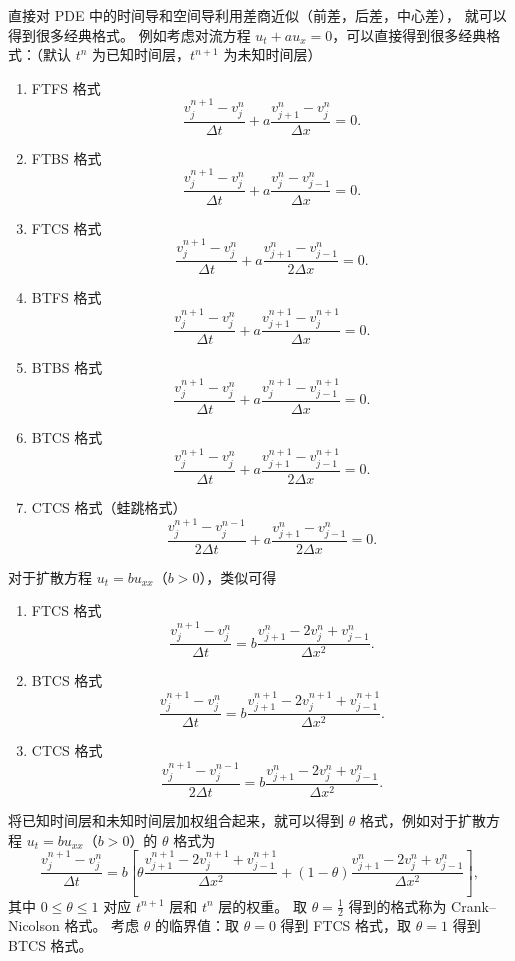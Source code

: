 直接对 PDE 中的时间导和空间导利用差商近似（前差，后差，中心差），
就可以得到很多经典格式。
例如考虑对流方程 $u_t + a u_x = 0$，可以直接得到很多经典格式：（默认 $t^n$ 为已知时间层，$t^{n+1}$ 为未知时间层）
\begin{enumerate}
    \item FTFS 格式
          \[
              \frac{v_{j}^{n+1} - v_{j}^n}{\Delta t} + a \frac{v_{j+1}^n - v_{j}^n}{\Delta x} = 0.
          \]
    \item FTBS 格式
          \[
              \frac{v_{j}^{n+1} - v_{j}^n}{\Delta t} + a \frac{v_{j}^n - v_{j-1}^n}{\Delta x} = 0.
          \]
    \item FTCS 格式
          \[
              \frac{v_{j}^{n+1} - v_{j}^n}{\Delta t} + a \frac{v_{j+1}^n - v_{j-1}^n}{2\Delta x} = 0.
          \]
    \item BTFS 格式
          \[
              \frac{v_{j}^{n+1} - v_{j}^n}{\Delta t} + a \frac{v_{j+1}^{n+1} - v_{j}^{n+1}}{\Delta x} = 0.
          \]
    \item BTBS 格式
          \[
              \frac{v_{j}^{n+1} - v_{j}^n}{\Delta t} + a \frac{v_{j}^{n+1} - v_{j-1}^{n+1}}{\Delta x} = 0.
          \]
    \item BTCS 格式
          \[
              \frac{v_{j}^{n+1} - v_{j}^n}{\Delta t} + a \frac{v_{j+1}^{n+1} - v_{j-1}^{n+1}}{2\Delta x} = 0.
          \]
    \item CTCS 格式（蛙跳格式）
          \[
              \frac{v_{j}^{n+1} - v_{j}^{n-1}}{2\Delta t} + a \frac{v_{j+1}^n - v_{j-1}^n}{2\Delta x} = 0.
          \]
\end{enumerate}
对于扩散方程 $u_t = b u_{xx}$（$b>0$），类似可得
\begin{enumerate}
    \item FTCS 格式
          \[
              \frac{v_{j}^{n+1} - v_{j}^n}{\Delta t} = b \frac{v_{j+1}^n - 2v_{j}^n + v_{j-1}^n}{\Delta x^2}.
          \]
    \item BTCS 格式
          \[
              \frac{v_{j}^{n+1} - v_{j}^n}{\Delta t} = b \frac{v_{j+1}^{n+1} - 2v_{j}^{n+1} + v_{j-1}^{n+1}}{\Delta x^2}.
          \]
    \item CTCS 格式
          \[
              \frac{v_{j}^{n+1} - v_{j}^{n-1}}{2\Delta t} = b \frac{v_{j+1}^{n} - 2v_{j}^{n} + v_{j-1}^{n}}{\Delta x^2}.
          \]
\end{enumerate}

将已知时间层和未知时间层加权组合起来，就可以得到 $\theta$ 格式，例如对于扩散方程 $u_t = b u_{xx}$（$b>0$）的 $\theta$ 格式为
\[
    \frac{v_{j}^{n+1} - v_{j}^n}{\Delta t}
    =
    b \left[
        \theta \frac{v_{j+1}^{n+1} - 2v_{j}^{n+1} + v_{j-1}^{n+1}}{\Delta x^2}
        + (1-\theta) \frac{v_{j+1}^n - 2v_{j}^n + v_{j-1}^n}{\Delta x^2}
        \right],
\]
其中 $0 \le \theta \le 1$ 对应 $t^{n+1}$ 层和 $t^n$ 层的权重。
取 $\theta = \frac12$ 得到的格式称为 Crank–Nicolson 格式。
考虑 $\theta$ 的临界值：取 $\theta = 0$ 得到 FTCS 格式，取 $\theta = 1$ 得到 BTCS 格式。


